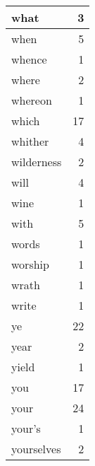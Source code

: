 \begin{center}
\begin{longtable}{l|r}
what & 3 \\ \hline
when & 5 \\ \hline
whence & 1 \\ \hline
where & 2 \\ \hline
whereon & 1 \\ \hline
which & 17 \\ \hline
whither & 4 \\ \hline
wilderness & 2 \\ \hline
will & 4 \\ \hline
wine & 1 \\ \hline
with & 5 \\ \hline
words & 1 \\ \hline
worship & 1 \\ \hline
wrath & 1 \\ \hline
write & 1 \\ \hline
ye & 22 \\ \hline
year & 2 \\ \hline
yield & 1 \\ \hline
you & 17 \\ \hline
your & 24 \\ \hline
your's & 1 \\ \hline
yourselves & 2 \\ \hline
\end{longtable}
\end{center}



\normalsize



